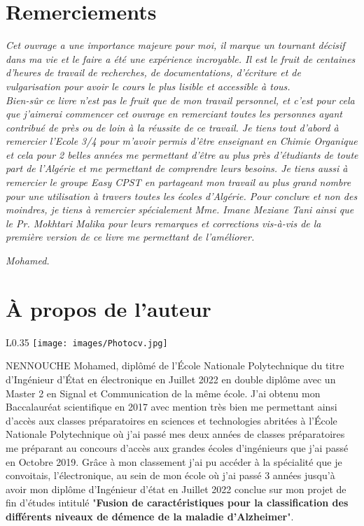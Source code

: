 \documentclass[a4paper, oneside]{book}
\begin{document}
\section*{Remerciements}
\begin{Large}
\textit{Cet ouvrage a une importance majeure pour moi, il marque un tournant décisif dans ma vie et le faire a été une expérience incroyable. Il est le fruit de centaines d'heures de travail de recherches, de documentations, d'écriture et de vulgarisation pour avoir le cours le plus lisible et accessible à tous.}\\[0.2mm]

\textit{Bien-sûr ce livre n'est pas le fruit que de mon travail personnel, et c'est pour cela que j'aimerai commencer cet ouvrage en remerciant toutes les personnes ayant contribué de près ou de loin à la réussite de ce travail. Je tiens tout d'abord à remercier l'Ecole 3/4 pour m'avoir permis d'être enseignant en Chimie Organique et cela pour 2 belles années me permettant d'être au plus près d'étudiants de toute part de l'Algérie et me permettant de comprendre leurs besoins. Je tiens aussi à remercier le groupe Easy CPST en partageant mon travail au plus grand nombre pour une utilisation à travers toutes les écoles d'Algérie. Pour conclure et non des moindres, je tiens à remercier spécialement Mme. Imane Meziane Tani ainsi que le Pr. Mokhtari Malika pour leurs remarques et corrections vis-à-vis de la première version de ce livre me permettant de l'améliorer.}
\begin{flushright}
   \textit{ Mohamed.}
\end{flushright}
\end{Large}
\vspace*{\fill}
\newpage
\vspace*{0.2\textheight}
\section*{À propos de l'auteur}
\begin{wrapfigure}[9]{L}{0.35\textwidth}
    \vspace*{-1cm}
    \centering
    \texttt{[image: images/Photocv.jpg]}
\end{wrapfigure}
NENNOUCHE Mohamed, diplômé de l'\'Ecole Nationale Polytechnique du titre d'Ingénieur d'\'Etat en électronique en Juillet 2022  en double diplôme avec un Master 2 en Signal et Communication de la même école. J'ai obtenu mon Baccalauréat scientifique en 2017 avec mention très bien me permettant ainsi d'accès aux classes préparatoires en sciences et technologies abritées à l'\'Ecole Nationale Polytechnique où j'ai passé mes deux années de classes préparatoires me préparant au concours d'accès aux grandes écoles d'ingénieurs que j'ai passé en Octobre 2019. Grâce à mon classement j'ai pu accéder à la spécialité que je convoitais, l'électronique, au sein de mon école où j'ai passé 3 années jusqu'à avoir mon diplôme d'Ingénieur d'état en Juillet 2022 conclue sur mon projet de fin d'études intitulé "\textbf{Fusion de caractéristiques pour la classification des différents niveaux de démence de la maladie d’Alzheimer}".
\end{document}
